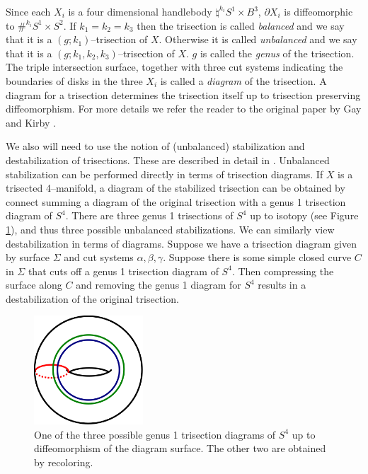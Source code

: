 \documentclass[12pt]{amsart}
\newcommand{\del}{\partial }
\theoremstyle{definition}
\theoremstyle{remark}
\begin{document}
Since each $X_i$ is a four dimensional handlebody $\natural^{k_i} S^1 \times B^3$, $\del X_i$ is diffeomorphic to $\#^{k_i} S^1 \times S^2$.  If $k_1 = k_2 = k_3$ then the trisection is called \emph{balanced} and we say that it is a $(g;k_1)$--trisection of $X$.  Otherwise it is called \emph{unbalanced} and we say that it is a $(g;k_1,k_2,k_3)$--trisection of $X$.  $g$ is called the \emph{genus} of the trisection.  The triple intersection surface, together with three cut systems indicating the boundaries of disks in the three $X_i$ is called a \emph{diagram} of the trisection.  A diagram for a trisection determines the trisection itself up to trisection preserving diffeomorphism.  For more details we refer the reader to the original paper by Gay and Kirby \cite{GayKirby1}. 

We also will need to use the notion of (unbalanced) stabilization and destabilization of trisections.  These are described in detail in \cite{MeierSchirmerZupan1}.  Unbalanced stabilization can be performed directly in terms of trisection diagrams.  If $X$ is a trisected 4--manifold, a diagram of the stabilized trisection can be obtained by connect summing a diagram of the original trisection with a genus 1 trisection diagram of $S^4$.  There are three genus 1 trisections of $S^4$ up to isotopy (see Figure \ref{s3g1}), and thus three possible unbalanced stabilizations.  We can similarly view destabilization in terms of diagrams.  Suppose we have a trisection diagram given by surface $\Sigma$ and cut systems $\alpha,\beta,\gamma$.  Suppose there is some simple closed curve $C$ in $\Sigma$ that cuts off a genus 1 trisection diagram of $S^4$.  Then compressing the surface along $C$ and removing the genus 1 diagram for $S^4$ results in a destabilization of the original trisection. 

\begin{figure}[h]
\centering
\includegraphics[height=1.6in]{S4trisection_genus1.png}
\caption{One of the three possible genus 1 trisection diagrams of $S^4$ up to diffeomorphism of the diagram surface.  The other two are obtained by recoloring.}
\label{s3g1}
\end{figure}
\end{document}
